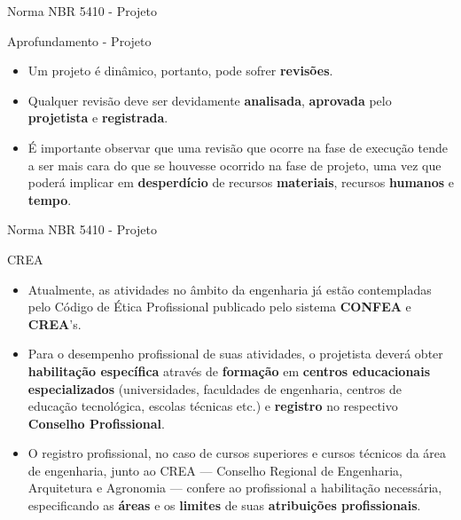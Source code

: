 \begin{frame}{Norma NBR 5410 - Projeto}
	\begin{block}{Aprofundamento - Projeto}
		\begin{itemize}

			\item Um projeto é dinâmico, portanto, pode sofrer \textbf{revisões}.
			\item Qualquer revisão deve ser devidamente \textbf{analisada}, \textbf{aprovada} pelo \textbf{projetista} e \textbf{registrada}.
			\item É importante observar que uma revisão que ocorre na fase de execução tende a ser mais cara do que se houvesse ocorrido na fase de projeto, uma vez que poderá implicar em \textbf{desperdício }de recursos \textbf{materiais}, recursos \textbf{humanos} e \textbf{tempo}.

		\end{itemize}
	\end{block}



\end{frame}


\begin{frame}{Norma NBR 5410 - Projeto}
	\begin{block}{CREA}
		\begin{itemize}
			\item Atualmente, as atividades no âmbito da engenharia já estão contempladas pelo Código de Ética Profissional publicado pelo sistema \textbf{CONFEA} e \textbf{CREA}'s.
			\item Para o desempenho profissional de suas atividades, o projetista deverá obter \textbf{habilitação específica} através de \textbf{formação} em \textbf{centros educacionais especializados} (universidades, faculdades de engenharia, centros de educação tecnológica, escolas técnicas etc.) e \textbf{registro} no respectivo \textbf{Conselho Profissional}.
			\item O registro profissional, no caso de cursos superiores e cursos técnicos da área de engenharia, junto ao CREA --- Conselho Regional de Engenharia, Arquitetura e Agronomia --- confere ao profissional a habilitação necessária, especificando as \textbf{áreas} e os \textbf{limites} de suas \textbf{atribuições profissionais}.
		\end{itemize}
	\end{block}
\end{frame}


